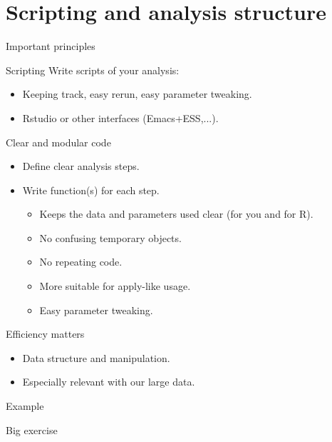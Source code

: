 \documentclass[10pt]{beamer}
\begin{document}
\section{Scripting and analysis structure}

\begin{frame}{Important principles}
  \begin{block}{Scripting}
    Write scripts of your analysis: 
    \begin{itemize}
    \item Keeping track, easy rerun, easy parameter tweaking.
    \item {\sf Rstudio} or other interfaces ({\sf Emacs+ESS},...).
    \end{itemize}
  \end{block}
  \begin{block}{Clear and modular code}
    \begin{itemize}
    \item Define clear analysis steps.
    \item Write function(s) for each step.
      \begin{itemize}
      \item Keeps the data and parameters used clear (for you and for R).
      \item No confusing temporary objects.
      \item No repeating code.
      \item More suitable for {\sf apply}-like usage.
      \item Easy parameter tweaking.
      \end{itemize}
    \end{itemize}
  \end{block}
  \begin{block}{Efficiency matters}
    \begin{itemize}
    \item Data structure and manipulation.
    \item Especially relevant with our large data.
    \end{itemize}

  \end{block}
\end{frame}

\begin{frame}{Example}
  
\end{frame}

\begin{frame}{Big exercise}
  
\end{frame}
\end{document}
